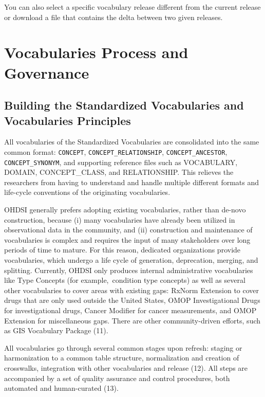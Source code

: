 \documentclass[
  letterpaper,
  paper=7in:10in,
  pagesize=pdftex,
  headinclude=on,
  footinclude=on,
  12pt]{scrbook}
\begin{document}
You can also select a specific vocabulary release different from the
current release or download a file that contains the delta between two
given releases.

\section{Vocabularies Process and
Governance}\label{vocabularies-process-and-governance}

\subsection{Building the Standardized Vocabularies and Vocabularies
Principles}\label{building-the-standardized-vocabularies-and-vocabularies-principles}

All vocabularies of the Standardized Vocabularies are consolidated into
the same common format: \texttt{CONCEPT},
\texttt{CONCEPT\_RELATIONSHIP}, \texttt{CONCEPT\_ANCESTOR},
\texttt{CONCEPT\_SYNONYM}, and supporting reference files such as
VOCABULARY, DOMAIN, CONCEPT\_CLASS, and RELATIONSHIP. This relieves the
researchers from having to understand and handle multiple different
formats and life-cycle conventions of the originating vocabularies.
\hl{}

OHDSI generally prefers adopting existing vocabularies, rather than
de-novo construction, because (i) many vocabularies have already been
utilized in observational data in the community, and (ii) construction
and maintenance of vocabularies is complex and requires the input of
many stakeholders over long periods of time to mature. For this reason,
dedicated organizations provide vocabularies, which undergo a life cycle
of generation, deprecation, merging, and splitting. Currently, OHDSI
only produces internal administrative vocabularies like Type Concepts
(for example,~condition type concepts) as well as several other
vocabularies to cover areas with existing gaps: RxNorm Extension to
cover drugs that are only used outside the United States, OMOP
Investigational Drugs for investigational drugs, Cancer Modifier for
cancer measurements, and OMOP Extension for miscellaneous gaps. There
are other community-driven efforts, such as GIS Vocabulary Package (11).

All vocabularies go through several common stages upon refresh: staging
or harmonization to a common table structure, normalization and creation
of crosswalks, integration with other vocabularies and release (12). All
steps are accompanied by a set of quality assurance and control
procedures, both automated and human-curated (13).
\end{document}
